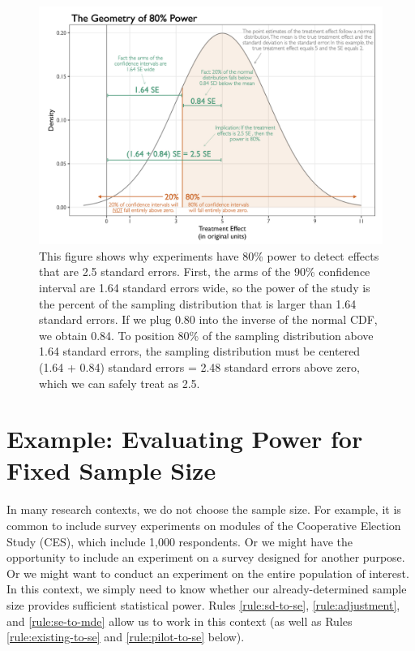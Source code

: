 \documentclass[12pt]{article}
\begin{document}
\begin{figure}
    \centering
  \includegraphics[width=\linewidth]{geometry.png}
    \caption{This figure shows why experiments have 80\% power to detect effects that are 2.5 standard errors. First, the arms of the 90\% confidence interval are 1.64 standard errors wide, so the power of the study is the percent of the sampling distribution that is larger than 1.64 standard errors. If we plug 0.80 into the inverse of the normal CDF, we obtain 0.84. To position 80\% of the sampling distribution above 1.64 standard errors, the sampling distribution must be centered (1.64 + 0.84) standard errors = 2.48 standard errors above zero, which we can safely treat as 2.5.}
    \label{fig:intuition}
\end{figure}

\section*{Example: Evaluating Power for Fixed Sample Size}

In many research contexts, we do not choose the sample size. 
For example, it is common to include survey experiments on modules of the Cooperative Election Study (CES), which include 1,000 respondents. 
Or we might have the opportunity to include an experiment on a survey designed for another purpose. 
Or we might want to conduct an experiment on the entire population of interest. 
In this context, we simply need to know whether our already-determined sample size provides sufficient statistical power. 
Rules \ref{rule:sd-to-se}, \ref{rule:adjustment}, and \ref{rule:se-to-mde} allow us to work in this context (as well as Rules \ref{rule:existing-to-se} and \ref{rule:pilot-to-se} below).
\end{document}
